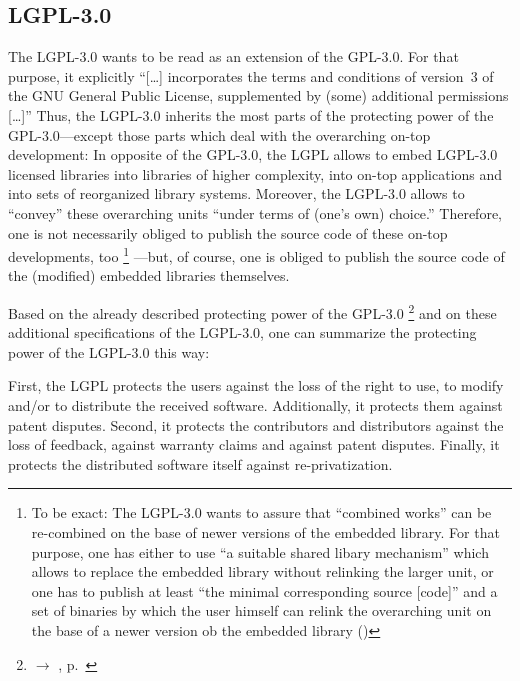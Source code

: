 \subsection{LGPL-3.0}

The LGPL-3.0 wants to be read as an extension of the GPL-3.0. For that purpose,
it explicitly \enquote{[\ldots] incorporates the terms and conditions of
version~3 of the GNU General Public License, supplemented by (some) additional 
permissions [\ldots]} Thus, the LGPL-3.0 inherits
the most parts of the protecting power of the GPL-3.0---except those parts which
deal with the overarching on-top development: In opposite of the GPL-3.0, the
LGPL allows to embed LGPL-3.0 licensed libraries into libraries of higher
complexity, into on-top applications
and into sets of reorganized library systems. Moreover, the
LGPL-3.0 allows to \enquote{convey} these overarching units \enquote{under terms
of (one's own) choice.}  Therefore, one is not necessarily obliged to
publish the source code of these on-top developments, too%
  \footnote{To be exact:  The LGPL-3.0 wants to assure that \enquote{combined
  works} can be re-combined on the base of newer versions of the embedded
  library. For that purpose, one has either to use \enquote{a suitable shared
  libary mechanism} which allows to replace the embedded library without
  relinking the larger unit, or one has to publish at least \enquote{the minimal
  corresponding source [code]} and a set of binaries by which the user himself
  can relink the overarching unit on the base of a newer version ob the embedded
  library (\cite[cf.][\nopage wp. §4]{Lgpl30FsfLicense2007a})}%
---but, of course,  one is obliged to publish the source code of the (modified)
embedded libraries themselves. 

Based on the already described protecting power of the GPL-3.0%
\footnote{$\rightarrow$ \oslic, p.\ }  
and on these additional specifications of the LGPL-3.0, one can summarize the
protecting power of the LGPL-3.0 this way:

First, the LGPL protects the users against the loss of the right to use, to
modify and/or to distribute the received software. Additionally, it protects
them against patent disputes. Second, it protects the contributors and
distributors against the loss of feedback, against warranty claims and against
patent disputes. Finally, it protects the distributed software itself against
re-privatization.

